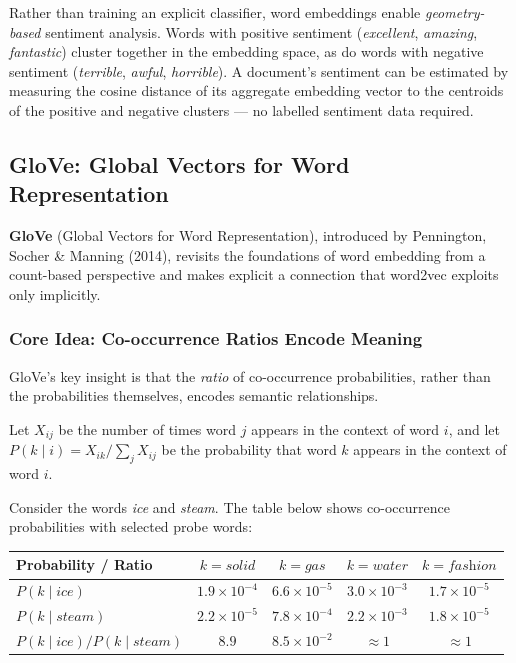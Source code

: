 \documentclass[11pt,a4paper]{article}
\newcommand{\term}[1]{\textcolor{DefGreen}{\textbf{#1}}\index{#1}}
\begin{document}
Rather than training an explicit classifier, word embeddings enable \emph{geometry-based} sentiment analysis. Words with positive sentiment (\textit{excellent}, \textit{amazing}, \textit{fantastic}) cluster together in the embedding space, as do words with negative sentiment (\textit{terrible}, \textit{awful}, \textit{horrible}). A document's sentiment can be estimated by measuring the cosine distance of its aggregate embedding vector to the centroids of the positive and negative clusters — no labelled sentiment data required.

\subsection{GloVe: Global Vectors for Word Representation}
\label{sec:glove}

\term{GloVe} (Global Vectors for Word Representation), introduced by Pennington, Socher \& Manning (2014), revisits the foundations of word embedding from a count-based perspective and makes explicit a connection that word2vec exploits only implicitly.

\subsubsection{Core Idea: Co-occurrence Ratios Encode Meaning}

GloVe's key insight is that the \emph{ratio} of co-occurrence probabilities, rather than the probabilities themselves, encodes semantic relationships.

Let $X_{ij}$ be the number of times word $j$ appears in the context of word $i$, and let $P(k \mid i) = X_{ik} / \sum_j X_{ij}$ be the probability that word $k$ appears in the context of word $i$.

Consider the words \textit{ice} and \textit{steam}. The table below shows co-occurrence probabilities with selected probe words:

\begin{center}
\renewcommand{\arraystretch}{1.25}
\begin{tabular}{lcccc}
\toprule
\textbf{Probability / Ratio} & $k=\textit{solid}$ & $k=\textit{gas}$ & $k=\textit{water}$ & $k=\textit{fashion}$ \\
\midrule
$P(k\mid\textit{ice})$           & $1.9\times10^{-4}$ & $6.6\times10^{-5}$ & $3.0\times10^{-3}$ & $1.7\times10^{-5}$ \\
$P(k\mid\textit{steam})$         & $2.2\times10^{-5}$ & $7.8\times10^{-4}$ & $2.2\times10^{-3}$ & $1.8\times10^{-5}$ \\
$P(k\mid\textit{ice})/P(k\mid\textit{steam})$ & $8.9$ & $8.5\times10^{-2}$ & $\approx 1$ & $\approx 1$ \\
\bottomrule
\end{tabular}
\end{center}
\end{document}

